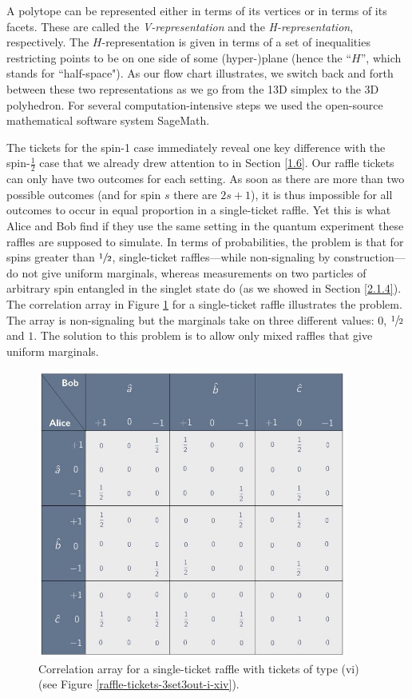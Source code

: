 A polytope can be represented either in terms of its vertices or in terms of its facets. These are called the \emph{V-representation} and the \emph{H-representation}, respectively. The $H$-representation is given in terms of a set of inequalities restricting points to be on one side of some (hyper-)plane (hence the ``$H$'', which stands for ``half-space"). As our flow chart illustrates, we switch back and forth between these two representations as we go from the 13D simplex to the 3D polyhedron. For several computation-intensive
steps we used the open-source mathematical software system SageMath. 

The tickets for the spin-1 case immediately reveal one key difference with the spin-$\frac12$ case that we already drew attention to in Section \ref{1.6}. Our raffle tickets can only have two outcomes for each setting. As soon as there are more than two possible outcomes (and for spin $s$ there are $2s + 1$), it is thus impossible for all outcomes to occur in equal proportion in a single-ticket raffle. Yet this is what Alice and Bob find if they use the same setting in the quantum experiment these raffles are supposed to simulate. In terms of probabilities, the problem is that for spins greater than $\sfrac12$, single-ticket raffles---while non-signaling by construction---do not give uniform marginals, whereas measurements on two particles of arbitrary spin entangled in the singlet state do (as we showed in Section \ref{2.1.4}). The correlation array in Figure \ref{CA-3set3out-raffle-vi} for a single-ticket raffle illustrates the problem. The array is non-signaling but the marginals take on three different values: $0$, $\sfrac12$ and $1$. The solution to this problem is to allow only mixed raffles that give uniform marginals. 

\begin{figure}[h]
 \centering
   \includegraphics[width=4in]{CA-3set3out-raffle-vi.jpeg} 
   \caption{Correlation array for a single-ticket raffle with tickets of type (vi) (see Figure \ref{raffle-tickets-3set3out-i-xiv}).}
   \label{CA-3set3out-raffle-vi}
\end{figure}

